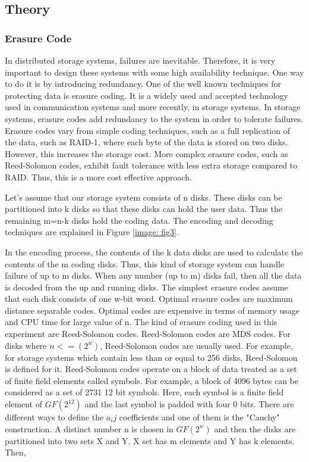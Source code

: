 \documentclass[conference]{IEEEtran}
\begin{document}
\subsection{Theory}
\subsubsection{Erasure Code}
In distributed storage systems, failures are inevitable. Therefore, it is very
important to design these systems with some high availability technique. One way
to do it is by introducing redundancy. One of the well known techniques for
protecting data is erasure coding. It is a widely used and accepted technology
used in communication systems and more recently, in storage systems. In storage
systems, erasure codes add redundancy to the system in order to tolerate
failures. Erasure codes vary from simple coding techniques, such as a full
replication of the data, such as RAID-1, where each byte of the data is stored
on two disks. However, this increases the storage cost. More complex erasure
codes, such as Reed-Solomon codes, exhibit fault tolerance with less extra
storage compared to RAID. Thus, this is a more cost effective approach.

Let's assume that our storage system consists of n disks. These disks can
be partitioned into k disks so that these disks can hold the user data. Thus
the remaining m=n-k disks hold the coding data. The encoding and decoding
techniques are explained in Figure \ref{image: fig3}.

In the encoding process, the contents of the k data disks are used to
calculate the contents of the m coding disks. Thus, this kind of storage
system can handle failure of up to m disks. When any number (up to m) disks
fail, then all the data is decoded from the up and running disks. The
simplest erasure codes assume that each disk consists of one w-bit word.
Optimal erasure codes are maximum distance separable codes. Optimal codes are
expensive in terms of memory usage and CPU time for large value of n. 
The kind of erasure coding used in this experiment are Reed-Solomon codes.
Reed-Solomon codes are MDS codes. For disks where $n<= (2^w)$, Reed-Solomon
codes are usually used. For example, for storage systems which contain
less than or equal to 256 disks, Reed-Solomon is defined for it.
Reed-Solomon codes operate on a block of data treated as a set of finite
field elements called symbols. For example, a block of 4096 bytes can be
considered as a set of 2731 12 bit symbols. Here, each symbol is a finite
field element of $GF(2^12)$ and the last symbol is padded with four 0 bits.
There are different ways to define the $a_ij$ coefficients and one of
them is the "Cauchy" construction. A distinct number n is chosen in $GF(2^w)$ and
then the disks are partitioned into two sets X and Y. X set has m elements
and Y has k elements. Then, 
\end{document}
